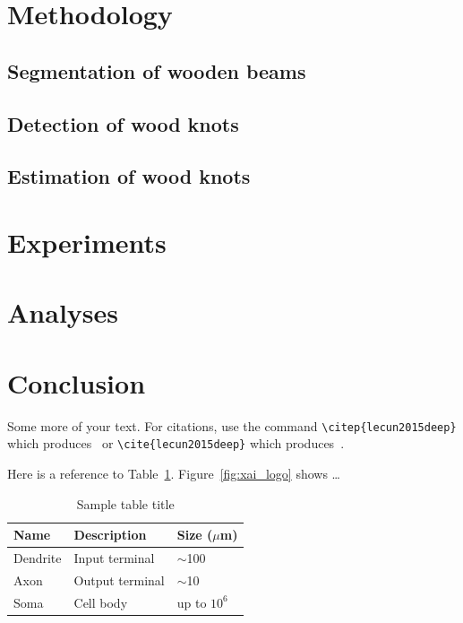 \documentclass{xai-thesis}
\begin{document}
\newpage
\section{Methodology}
\label{sec:second}



\subsection{Segmentation of wooden beams}
\label{subsec:another}



\subsection{Detection of wood knots}
\label{subsec:yetanother}



\subsection{Estimation of wood knots}
\label{subsec:last}



\newpage
\section{Experiments}


\newpage
\section{Analyses}


\newpage
\section{Conclusion}


Some more of your text. For citations, use the command \verb+\citep{lecun2015deep}+ which produces~\citep{lecun2015deep} or \verb+\cite{lecun2015deep}+ which produces~\cite{lecun2015deep}.


Here is a reference to Table~\ref{t1:sample}. Figure~\ref{fig:xai_logo} shows \ldots


\begin{table}[ht]
	\caption{Sample table title}
	\centering
	\begin{tabular}{lll}
		\hline
		Name     & Description     & Size ($\mu$m) \\
		\hline
		Dendrite & Input terminal  & $\sim$100     \\
		Axon     & Output terminal & $\sim$10      \\
		Soma     & Cell body       & up to $10^6$  \\
		\hline
	\end{tabular}
   \label{t1:sample}
\end{table}
\end{document}
